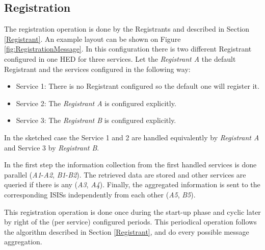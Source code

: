 \documentclass{article}                            %
\begin{document}
\subsection{Registration}
\label{Registration}
The registration operation is done by the Registrants and described in Section \ref{Registrant}. An example layout can be shown on Figure \ref{fig:RegistrationMessage}. In this configuration there is two different Registrant configured in one HED for three services. Let the \textit{Registrant A} the default Registrant and the services configured in the following way:\par
\begin{itemize}
  \item Service 1: There is no Registrant configured so the default one will register it.
  \item Service 2: The \textit{Registrant A} is configured explicitly.
  \item Service 3: The \textit{Registrant B} is configured explicitly.
\end{itemize}
In the sketched case the Service 1 and 2 are handled equivalently by \textit{Registrant A} and Service 3 by \textit{Registrant B}.\par
In the first step the information collection from the first handled services is done parallel (\textit{A1}-\textit{A2}, \textit{B1}-\textit{B2}). The retrieved data are stored and other services are queried if there is any (\textit{A3}, \textit{A4}). Finally, the aggregated information is sent to the corresponding ISISs independently from each other (\textit{A5}, \textit{B5}).\par
\begin{figure}[ht]
\end{figure}
This registration operation is done once during the start-up phase and cyclic later by right of the (per service) configured periods. This periodical operation follows the algorithm described in Section \ref{Registrant}, and do every possible message aggregation.
\end{document}
